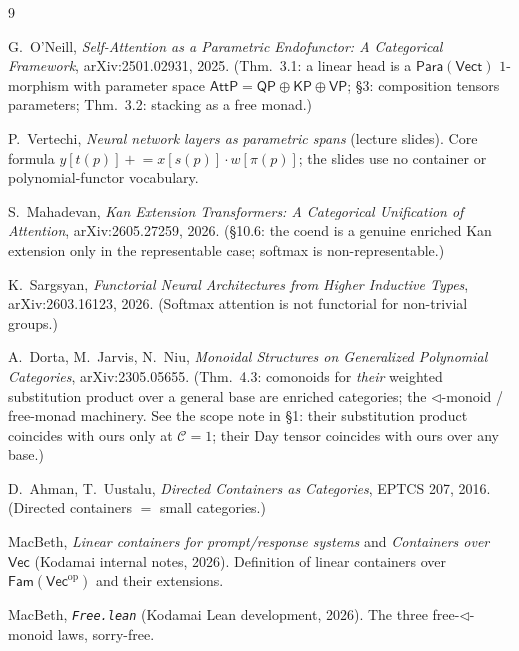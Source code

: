 \documentclass[11pt]{article}
\newcommand{\Vect}{\mathsf{Vect}}
\providecommand{\Vec}{}\renewcommand{\Vec}{\mathsf{Vec}}
\newcommand{\Fam}{\mathsf{Fam}}
\newcommand{\Para}{\mathsf{Para}}
\newcommand{\op}{\mathrm{op}}
\newcommand{\AttP}{\mathsf{AttP}}
\theoremstyle{plain}
\theoremstyle{definition}
\begin{document}
\begin{thebibliography}{9}

G.~O'Neill,
\emph{Self-Attention as a Parametric Endofunctor: A Categorical Framework},
arXiv:2501.02931, 2025. (Thm.~3.1: a linear head is a $\Para(\Vect)$ $1$-morphism with parameter space
$\AttP=\mathsf{QP}\oplus\mathsf{KP}\oplus\mathsf{VP}$; \S3: composition tensors parameters; Thm.~3.2: stacking as a
free monad.)

P.~Vertechi,
\emph{Neural network layers as parametric spans} (lecture slides). Core formula
$y[t(p)]\mathrel{+}=x[s(p)]\cdot w[\pi(p)]$; the slides use no container or polynomial-functor vocabulary.

S.~Mahadevan,
\emph{Kan Extension Transformers: A Categorical Unification of Attention}, arXiv:2605.27259, 2026. (\S10.6: the
coend is a genuine enriched Kan extension only in the representable case; softmax is non-representable.)

K.~Sargsyan,
\emph{Functorial Neural Architectures from Higher Inductive Types}, arXiv:2603.16123, 2026. (Softmax attention is
not functorial for non-trivial groups.)

A.~Dorta, M.~Jarvis, N.~Niu,
\emph{Monoidal Structures on Generalized Polynomial Categories}, arXiv:2305.05655. (Thm.~4.3: comonoids for
\emph{their} weighted substitution product over a general base are enriched categories; the
$\lhd$-monoid / free-monad machinery. See the scope note in \S1: their substitution product
coincides with ours only at $\mathcal C=1$; their Day tensor coincides with ours over any base.)

D.~Ahman, T.~Uustalu,
\emph{Directed Containers as Categories}, EPTCS 207, 2016. (Directed containers $=$ small categories.)

MacBeth,
\emph{Linear containers for prompt/response systems} and \emph{Containers over $\Vec$} (Kodamai internal notes,
2026). Definition of linear containers over $\Fam(\Vec^{\op})$ and their extensions.

MacBeth,
\emph{\texttt{Free.lean}} (Kodamai Lean development, 2026). The three free-$\lhd$-monoid laws, sorry-free.

\end{thebibliography}
\end{document}
